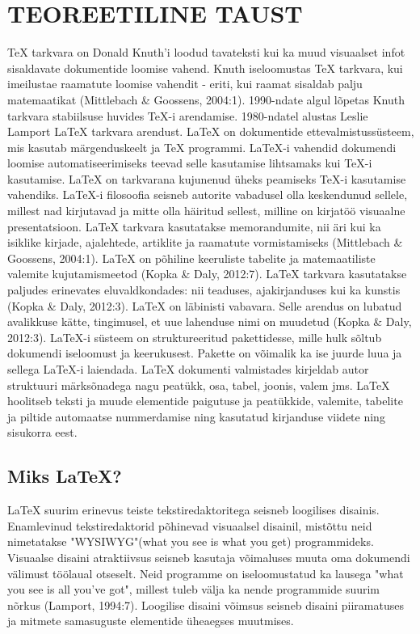 \documentclass{21kuur}
\begin{document}
\chapter{TEOREETILINE TAUST}
TeX tarkvara on Donald Knuth'i loodud tavateksti kui ka muud visuaalset infot sisaldavate dokumentide loomise vahend. Knuth iseloomustas TeX tarkvara, kui imeilustae raamatute loomise vahendit - eriti, kui raamat sisaldab palju matemaatikat (Mittlebach \& Goossens, 2004:1). 1990-ndate algul lõpetas Knuth tarkvara stabiilsuse huvides TeX-i arendamise. 1980-ndatel alustas Leslie Lamport LaTeX tarkvara arendust. LaTeX on dokumentide ettevalmistussüsteem, mis kasutab märgenduskeelt ja TeX programmi. LaTeX-i vahendid dokumendi loomise automatiseerimiseks teevad selle kasutamise lihtsamaks kui TeX-i kasutamise. LaTeX on tarkvarana kujunenud üheks peamiseks TeX-i kasutamise vahendiks. LaTeX-i filosoofia seisneb autorite vabadusel olla keskendunud sellele, millest nad kirjutavad ja mitte olla häiritud sellest, milline on kirjatöö visuaalne presentatsioon. LaTeX tarkvara kasutatakse memorandumite, nii äri kui ka isiklike kirjade, ajalehtede, artiklite ja raamatute vormistamiseks (Mittlebach \& Goossens, 2004:1). LaTeX on põhiline keeruliste tabelite ja matemaatiliste valemite kujutamismeetod (Kopka \& Daly, 2012:7). LaTeX tarkvara kasutatakse paljudes erinevates eluvaldkondades: nii teaduses, ajakirjanduses kui ka kunstis (Kopka \& Daly, 2012:3). LaTeX on läbinisti vabavara. Selle arendus on lubatud avalikkuse kätte, tingimusel, et uue lahenduse nimi on muudetud (Kopka \& Daly, 2012:3). 
LaTeX-i süsteem on struktureeritud pakettidesse, mille hulk sõltub dokumendi iseloomust ja keerukusest. Pakette on võimalik ka ise juurde luua ja sellega LaTeX-i laiendada. LaTeX dokumenti valmistades kirjeldab autor struktuuri märksõnadega nagu peatükk, osa, tabel, joonis, valem jms. LaTeX hoolitseb teksti ja muude elementide paigutuse ja peatükkide, valemite, tabelite ja piltide automaatse nummerdamise ning kasutatud kirjanduse viidete ning sisukorra eest.

\section{Miks LaTeX?}
LaTeX suurim erinevus teiste tekstiredaktoritega seisneb loogilises disainis. Enamlevinud tekstiredaktorid põhinevad visuaalsel disainil, mistõttu neid nimetatakse "WYSIWYG"(what you see is what you get) programmideks. Visuaalse disaini atraktiivsus seisneb kasutaja võimaluses muuta oma dokumendi välimust töölaual otseselt. Neid programme on iseloomustatud ka lausega "what you see is all you've got", millest tuleb välja ka nende programmide suurim nõrkus (Lamport, 1994:7). Loogilise disaini võimsus seisneb disaini piiramatuses ja mitmete samasuguste elementide üheaegses muutmises. 
\end{document}
